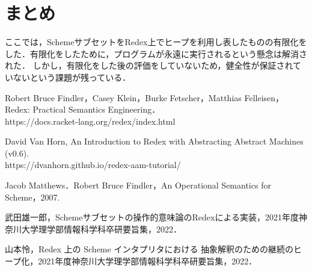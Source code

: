 \documentclass[twocolumn]{jsarticle}
\begin{document}
\section{まとめ}
ここでは，SchemeサブセットをRedex上でヒープを利用し表したものの有限化をした．有限化をしたために，プログラムが永遠に実行されるという懸念は解消された．
しかし，有限化をした後の評価をしていないため，健全性が保証されていないという課題が残っている．

\begin{thebibliography}{99}

\bibitem{}Robert Bruce Findler，Casey Klein，Burke Fetscher，Matthias Felleisen，Redex: Practical Semantics Engineering．\\
 https://docs.racket-lang.org/redex/index.html

\bibitem{}David Van Horn, An Introduction to Redex with Abstracting Abstract Machines (v0.6).\\ https://dvanhorn.github.io/redex-aam-tutorial/

Jacob Matthews．Robert Bruce Findler，An Operational Semantics for Scheme，2007.

武田雄一郎，Schemeサブセットの操作的意味論のRedexによる実装，2021年度神奈川大学理学部情報科学科卒研要旨集，2022．

山本怜，Redex 上の Scheme インタプリタにおける
抽象解釈のための継続のヒープ化，2021年度神奈川大学理学部情報科学科卒研要旨集，2022．
\end{thebibliography}
\end{document}
